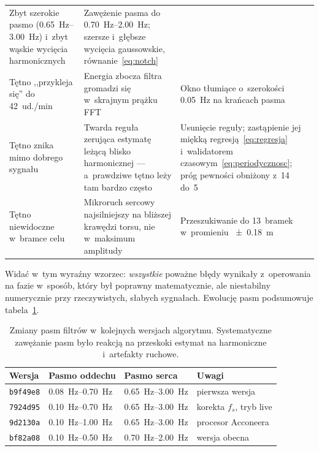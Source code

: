 \documentclass[12pt,a4paper,oneside]{report}
\begin{document}
{\begin{longtable}{@{}p{3.4cm}p{4.6cm}p{4.6cm}@{}}
Zbyt szerokie pasmo (\SIrange{0.65}{3.00}{Hz}) i~zbyt wąskie wycięcia
harmonicznych &
Zawężenie pasma do \SIrange{0.70}{2.00}{Hz}; szersze i~głębsze wycięcia
gaussowskie, równanie~\eqref{eq:notch} \\
\addlinespace
Tętno ,,przykleja się'' do 42~ud./min &
Energia zbocza filtra gromadzi się w~skrajnym prążku FFT &
Okno tłumiące o~szerokości \SI{0.05}{Hz} na krańcach pasma \\
\addlinespace
Tętno znika mimo dobrego sygnału &
Twarda reguła zerująca estymatę leżącą blisko harmonicznej --- a~prawdziwe
tętno leży tam bardzo często &
Usunięcie reguły; zastąpienie jej miękką regresją~\eqref{eq:regresja}
i~walidatorem czasowym~\eqref{eq:periodycznosc}; próg pewności obniżony
z~14 do~5 \\
\addlinespace
Tętno niewidoczne w~bramce celu &
Mikroruch sercowy najsilniejszy na bliższej krawędzi torsu, nie w~maksimum
amplitudy &
Przeszukiwanie do 13~bramek w~promieniu \SI{\pm 0.18}{m} \\
\end{longtable}
}

Widać w~tym wyraźny wzorzec: \emph{wszystkie} poważne błędy wynikały
z~operowania na fazie w~sposób, który był poprawny matematycznie, ale
niestabilny numerycznie przy rzeczywistych, słabych sygnałach. Ewolucję pasm
podsumowuje tabela~\ref{tab:pasma}.

\begin{table}[H]
\centering
\caption[Ewolucja pasm filtrów]{Zmiany pasm filtrów w~kolejnych wersjach
algorytmu. Systematyczne zawężanie pasm było reakcją na przeskoki estymat
na harmoniczne i~artefakty ruchowe.}
\label{tab:pasma}
\small
\begin{tabular}{@{}llll@{}}
\toprule
\textbf{Wersja} & \textbf{Pasmo oddechu} & \textbf{Pasmo serca} & \textbf{Uwagi} \\
\midrule
\texttt{b9f49e8} & \SIrange{0.08}{0.70}{Hz} & \SIrange{0.65}{3.00}{Hz} & pierwsza wersja \\
\texttt{7924d95} & \SIrange{0.10}{0.70}{Hz} & \SIrange{0.65}{3.00}{Hz} & korekta $f_s$, tryb live \\
\texttt{9d2130a} & \SIrange{0.10}{1.00}{Hz} & \SIrange{0.65}{3.00}{Hz} & procesor Acconeera \\
\texttt{bf82a08} & \SIrange{0.10}{0.50}{Hz} & \SIrange{0.70}{2.00}{Hz} & wersja obecna \\
\bottomrule
\end{tabular}
\end{table}
\end{document}
